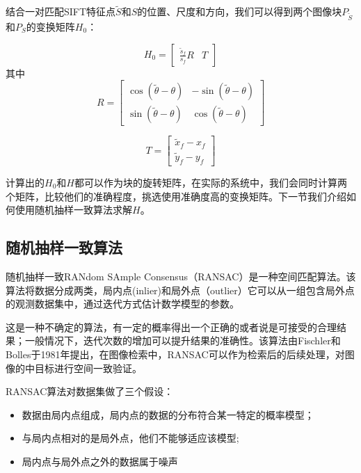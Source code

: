 结合一对匹配SIFT特征点\(\tilde{S}\)和\(S\)的位置、尺度和方向，我们可以得到两个图像块\(P_{\tilde{S}}\)和\(P_S\)的变换矩阵\(H_0\)：

\begin{equation}
	H_0 = 
	\begin{bmatrix}
	\frac{\tilde{s}_f}{s_f} R & T
	\end{bmatrix}
\end{equation}
其中
\begin{equation}
	R = 
	\begin{bmatrix}
		\cos{(\tilde{\theta}-\theta)} & -\sin{(\tilde{\theta}-\theta)} \\
		\sin{(\tilde{\theta}-\theta)} & \cos{(\tilde{\theta}-\theta)} 
	\end{bmatrix}
\end{equation}

\begin{equation}
	T = 
	\begin{bmatrix}
		\tilde{x}_f - x_f \\
		\tilde{y}_f - y_f
	\end{bmatrix}
\end{equation}

计算出的\(H_0\)和\(H\)都可以作为块的旋转矩阵，在实际的系统中，我们会同时计算两个矩阵，比较他们的准确程度，挑选使用准确度高的变换矩阵。下一节我们介绍如何使用随机抽样一致算法求解\(H\)。

\subsection{随机抽样一致算法}
随机抽样一致RANdom SAmple Consensus（RANSAC）是一种空间匹配算法。该算法将数据分成两类，局内点(inlier)和局外点（outlier）它可以从一组包含局外点的观测数据集中，通过迭代方式估计数学模型的参数。

这是一种不确定的算法，有一定的概率得出一个正确的或者说是可接受的合理结果；一般情况下，迭代次数的增加可以提升结果的准确性。该算法由Fischler和Bolles于1981年提出，在图像检索中，RANSAC可以作为检索后的后续处理，对图像的中目标进行空间一致验证。

RANSAC算法对数据集做了三个假设：

\begin{itemize}
\item 数据由局内点组成，局内点的数据的分布符合某一特定的概率模型；
\item 与局内点相对的是局外点，他们不能够适应该模型;
\item 局内点与局外点之外的数据属于噪声
\end{itemize}

